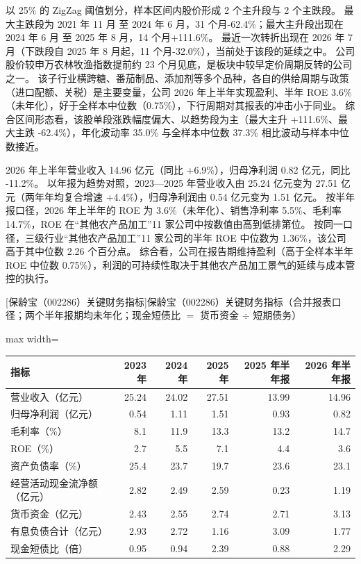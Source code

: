  以 25\% 的 ZigZag 阈值划分，样本区间内股价形成 2 个主升段与 2 个主跌段。 最大主跌段为 2021 年 11 月 至 2024 年 6 月，31 个月-62.4\%；最大主升段出现在 2024 年 6 月 至 2025 年 8 月，14 个月+111.6\%。 最近一次转折出现在 2026 年 7 月（下跌段自 2025 年 8 月起，11 个月-32.0\%），当前处于该段的延续之中。 公司股价较申万农林牧渔指数提前约 23 个月见底，是板块中较早定价周期反转的公司之一。 该子行业横跨糖、番茄制品、添加剂等多个品种，各自的供给周期与政策（进口配额、关税）是主要变量，公司 2026 年上半年实现盈利、半年 ROE 3.6\%（未年化），好于全样本中位数（0.75\%），下行周期对其报表的冲击小于同业。 综合区间形态看，该股单段涨跌幅度偏大、以趋势段为主（最大主升 +111.6\%、最大主跌 -62.4\%），年化波动率 35.0\% 与全样本中位数 37.3\% 相比波动与样本中位数接近。

 2026 年上半年营业收入 14.96 亿元（同比 +6.9\%），归母净利润 0.82 亿元，同比 -11.2\%。 以年报为趋势对照，2023---2025 年营业收入由 25.24 亿元变为 27.51 亿元（两年年均复合增速 +4.4\%），归母净利润由 0.54 亿元变为 1.51 亿元。 按半年报口径，2026 年上半年的 ROE 为 3.6\%（未年化）、销售净利率 5.5\%、毛利率 14.7\%，ROE 在“其他农产品加工”11 家公司中按数值由高到低排第位。 按同一口径，三级行业“其他农产品加工”11 家公司的半年 ROE 中位数为 1.36\%，该公司高于其中位数 2.26 个百分点。 综合看，公司在报告期维持盈利（高于全样本半年 ROE 中位数 0.75\%），利润的可持续性取决于其他农产品加工景气的延续与成本管控的执行。

\begin{center}\small\setlength{\tabcolsep}{3.4pt}
[保龄宝（002286）关键财务指标]{保龄宝（002286）关键财务指标（合并报表口径；两个半年报期均未年化；现金短债比 $=$ 货币资金 $\div$ 短期债务）}
\begin{adjustbox}{max width=\textwidth}
\begin{tabular}{@{}lrrrrr@{}}
\toprule
指标 & 2023 年 & 2024 年 & 2025 年 & 2025 年半年报 & 2026 年半年报 \\
\midrule
营业收入（亿元） & 25.24 & 24.02 & 27.51 & 13.99 & 14.96 \\
归母净利润（亿元） & 0.54 & 1.11 & 1.51 & 0.93 & 0.82 \\
毛利率（\%） & 8.1 & 11.9 & 13.3 & 13.2 & 14.7 \\
ROE（\%） & 2.7 & 5.5 & 7.1 & 4.4 & 3.6 \\
资产负债率（\%） & 25.4 & 23.7 & 19.7 & 23.6 & 23.1 \\
经营活动现金流净额（亿元） & 2.82 & 2.49 & 2.59 & 0.23 & 1.19 \\
货币资金（亿元） & 2.43 & 2.55 & 2.74 & 2.71 & 3.13 \\
有息负债合计（亿元） & 2.93 & 2.72 & 1.16 & 3.09 & 1.77 \\
现金短债比（倍） & 0.95 & 0.94 & 2.39 & 0.88 & 2.29 \\
\bottomrule
\end{tabular}
\end{adjustbox}
\end{center}

